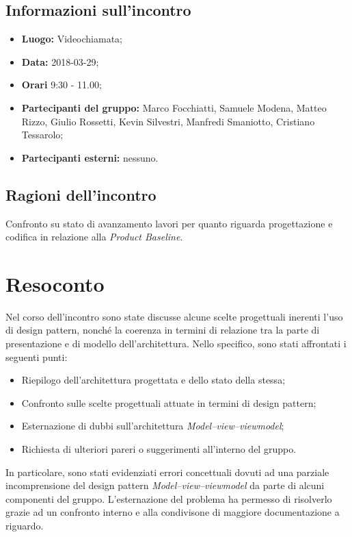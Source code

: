 \documentclass[openany,12pt,a4paper]{article}
\begin{document}
  \subsection{Informazioni sull'incontro} 
   
  \begin{itemize}  
      \item \textbf{Luogo:} Videochiamata;
      \item \textbf{Data:} 2018-03-29; 
      \item \textbf{Orari} 9:30 - 11.00;
      \item \textbf{Partecipanti del gruppo:} Marco Focchiatti, Samuele Modena, Matteo Rizzo, Giulio Rossetti, Kevin Silvestri, Manfredi Smaniotto, Cristiano Tessarolo; 
      \item \textbf{Partecipanti esterni:} nessuno. 
  \end{itemize} 
 
  \subsection{Ragioni dell'incontro} 
  Confronto su stato di avanzamento lavori per quanto riguarda progettazione e codifica in relazione alla \textit{Product Baseline}.
 
  \section{Resoconto} 
  Nel corso dell'incontro sono state discusse alcune scelte progettuali inerenti l'uso di design pattern, nonché la coerenza in termini di relazione tra la parte di presentazione e di modello dell'architettura. Nello specifico, sono stati affrontati i seguenti punti:
	
  \begin{itemize}
	\item Riepilogo dell'architettura progettata e dello stato della stessa;
	\item Confronto sulle scelte progettuali attuate in termini di design pattern;
	\item Esternazione di dubbi sull'architettura \textit{Model–view–viewmodel};
	\item Richiesta di ulteriori pareri o suggerimenti all'interno del gruppo.
  \end{itemize}

  In particolare, sono stati evidenziati errori concettuali dovuti ad una parziale incomprensione del design pattern \textit{Model–view–viewmodel} da parte di alcuni componenti del gruppo. L'esternazione del problema ha permesso di risolverlo grazie ad un confronto interno e alla condivisone di maggiore documentazione a riguardo. 
 
\end{document}
